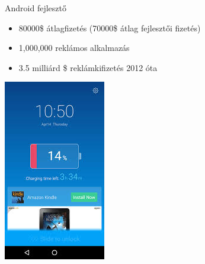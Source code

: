 \documentclass{beamer}
\begin{document}
\begin{frame}[fragile]{Android fejlesztő}
	\begin{minipage}{0.49\textwidth}
		\begin{itemize}
			\item 80000\$ átlagfizetés (70000\$ átlag fejlesztői fizetés)
			\item 1,000,000 reklámos alkalmazás
			\item 3.5 milliárd \$ reklámkifizetés 2012 óta
		\end{itemize}
	\end{minipage}
	\begin{minipage}{.49\textwidth}
		\includegraphics[width=.8\linewidth]{figures/androidad.jpeg}
	\end{minipage}
\end{frame}
\end{document}
